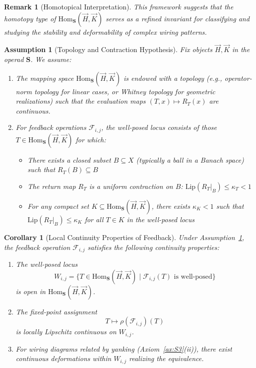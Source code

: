 \documentclass[11pt]{article}
\newtheorem{assumption}{Assumption}
\newtheorem{corollary}{Corollary}
\newtheorem{remark}{Remark}
\begin{document}
\begin{remark}[Homotopical Interpretation]
This framework suggests that the homotopy type of $\mathrm{Hom}_{\mathbf{S}}(\vec{H}, \vec{K})$ serves as a refined invariant for classifying and studying the stability and deformability of complex wiring patterns.
\end{remark}


\begin{assumption}[Topology and Contraction Hypothesis]\label{assump:top-contract}
Fix objects $\vec H,\vec K$ in the operad $\mathbf S$. We assume:
\begin{enumerate}
  \item The mapping space $\mathrm{Hom}_{\mathbf S}(\vec H,\vec K)$ is endowed with a topology (e.g., operator-norm topology for linear cases, or Whitney topology for geometric realizations) such that the evaluation maps $(T,x) \mapsto R_T(x)$ are continuous.
  
  \item For feedback operations $\mathcal F_{i,j}$, the \emph{well-posed locus} consists of those $T \in \mathrm{Hom}_{\mathbf S}(\vec H,\vec K)$ for which:
  \begin{itemize}
    \item There exists a closed subset $B \subseteq X$ (typically a ball in a Banach space) such that $R_T(B) \subseteq B$
    \item The return map $R_T$ is a uniform contraction on $B$: $\mathrm{Lip}(R_T|_B) \leq \kappa_T < 1$
    \item For any compact set $K \subseteq \mathrm{Hom}_{\mathbf S}(\vec H,\vec K)$, there exists $\kappa_K < 1$ such that $\mathrm{Lip}(R_T|_B) \leq \kappa_K$ for all $T \in K$ in the well-posed locus
  \end{itemize}
\end{enumerate}
\end{assumption}


\begin{corollary}[Local Continuity Properties of Feedback]\label{cor:feedback-continuity}
Under Assumption~\ref{assump:top-contract}, the feedback operation $\mathcal F_{i,j}$ satisfies the following continuity properties:
\begin{enumerate}
  \item The well-posed locus
  \[
    W_{i,j} = \{T \in \mathrm{Hom}_{\mathbf S}(\vec H,\vec K) \mid \mathcal F_{i,j}(T) \text{ is well-posed}\}
  \]
  is open in $\mathrm{Hom}_{\mathbf S}(\vec H,\vec K)$.
  
  \item The fixed-point assignment
  \[
    T \mapsto \rho(\mathcal F_{i,j})(T)
  \]
  is locally Lipschitz continuous on $W_{i,j}$.
  
  \item For wiring diagrams related by yanking (Axiom~\ref{ax:S3}(ii)), there exist continuous deformations within $W_{i,j}$ realizing the equivalence.
\end{enumerate}
\end{corollary}
\end{document}
